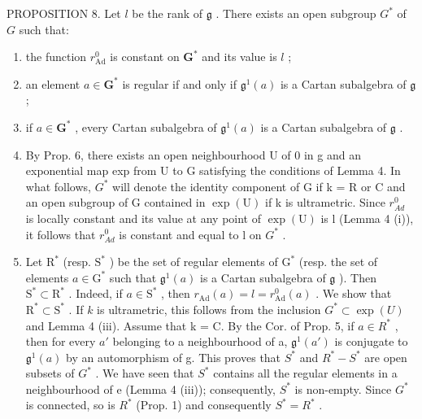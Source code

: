 PROPOSITION 8. Let \(l\) be the rank of \(\mathfrak{g}\) . There exists an open subgroup \(G^*\) of \(G\) such that:

\begin{enumerate}
\def\labelenumi{(\roman{enumi})}
\item
  the function \(r_{\mathrm{Ad}}^0\) is constant on \(\mathbf{G}^*\) and its value is \(l\) ;
\item
  an element \(a \in \mathbf{G}^*\) is regular if and only if \(\mathfrak{g}^1(a)\) is a Cartan subalgebra of \(\mathfrak{g}\) ;
\item
  if \(a \in \mathbf{G}^*\) , every Cartan subalgebra of \(\mathfrak{g}^1(a)\) is a Cartan subalgebra of \(\mathfrak{g}\) .
\item
  By Prop. 6, there exists an open neighbourhood U of 0 in g and an exponential map exp from U to G satisfying the conditions of Lemma 4. In what follows, \(G^{*}\) will denote the identity component of G if k = R or C and an open subgroup of G contained in \(\exp(\mathrm{U})\) if k is ultrametric. Since \(r_{Ad}^{0}\) is locally constant and its value at any point of \(\exp(\mathrm{U})\) is l (Lemma 4 (i)), it follows that \(r_{Ad}^{0}\) is constant and equal to l on \(G^{*}\) .
\item
  Let \(\mathrm{R}^*\) (resp. \(\mathrm{S}^*\) ) be the set of regular elements of \(\mathrm{G}^*\) (resp. the set of elements \(a \in \mathrm{G}^*\) such that \(\mathfrak{g}^1(a)\) is a Cartan subalgebra of \(\mathfrak{g}\) ). Then \(\mathrm{S}^* \subset \mathrm{R}^*\) . Indeed, if \(a \in \mathrm{S}^*\) , then \(r_{\mathrm{Ad}}(a) = l = r_{\mathrm{Ad}}^0(a)\) . We show that \(\mathrm{R}^* \subset \mathrm{S}^*\) . If \(k\) is ultrametric, this follows from the inclusion \(G^{*} \subset \exp(U)\) and Lemma 4 (iii). Assume that k = C. By the Cor. of Prop. 5, if \(a \in R^{*}\) , then for every \(a'\) belonging to a neighbourhood of a, \(\mathfrak{g}^{1}(a')\) is conjugate to \(\mathfrak{g}^{1}(a)\) by an automorphism of g. This proves that \(S^{*}\) and \(R^{*} - S^{*}\) are open subsets of \(G^{*}\) . We have seen that \(S^{*}\) contains all the regular elements in a neighbourhood of e (Lemma 4 (iii)); consequently, \(S^{*}\) is non-empty. Since \(G^{*}\) is connected, so is \(R^{*}\) (Prop. 1) and consequently \(S^{*} = R^{*}\) .
\end{enumerate}

